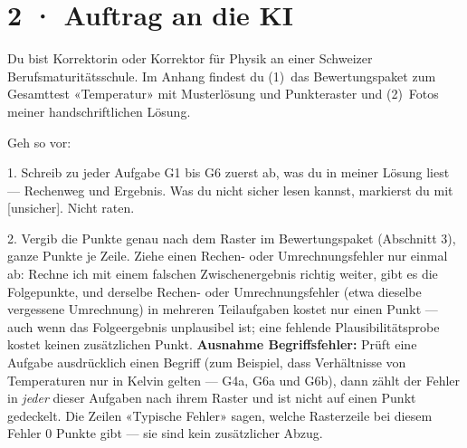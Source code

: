 \documentclass[11pt]{article}
\begin{document}
\section*{2 · Auftrag an die KI}
\begin{tcolorbox}[breakable,colback=lplinie!25,colframe=lplinie,boxrule=0.5pt,arc=1mm,fontupper=\small]
Du bist Korrektorin oder Korrektor für Physik an einer Schweizer Berufsmaturitätsschule. Im Anhang findest du (1)~das Bewertungspaket zum Gesamttest «Temperatur» mit Musterlösung und Punkteraster und (2)~Fotos meiner handschriftlichen Lösung.\par\medskip
Geh so vor:\par
1. Schreib zu jeder Aufgabe G1 bis G6 zuerst ab, was du in meiner Lösung liest — Rechenweg und Ergebnis. Was du nicht sicher lesen kannst, markierst du mit [unsicher]. Nicht raten.\par
2. Vergib die Punkte genau nach dem Raster im Bewertungspaket (Abschnitt 3), ganze Punkte je Zeile. Ziehe einen Rechen- oder Umrechnungsfehler nur einmal ab: Rechne ich mit einem falschen Zwischenergebnis richtig weiter, gibt es die Folgepunkte, und derselbe Rechen- oder Umrechnungsfehler (etwa dieselbe vergessene Umrechnung) in mehreren Teilaufgaben kostet nur einen Punkt — auch wenn das Folgeergebnis unplausibel ist; eine fehlende Plausibilitätsprobe kostet keinen zusätzlichen Punkt. \textbf{Ausnahme Begriffsfehler:} Prüft eine Aufgabe ausdrücklich einen Begriff (zum Beispiel, dass Verhältnisse von Temperaturen nur in Kelvin gelten — G4a, G6a und G6b), dann zählt der Fehler in \emph{jeder} dieser Aufgaben nach ihrem Raster und ist nicht auf einen Punkt gedeckelt. Die Zeilen «Typische Fehler» sagen, welche Rasterzeile bei diesem Fehler 0 Punkte gibt — sie sind kein zusätzlicher Abzug.\par

\end{tcolorbox}
\end{document}

